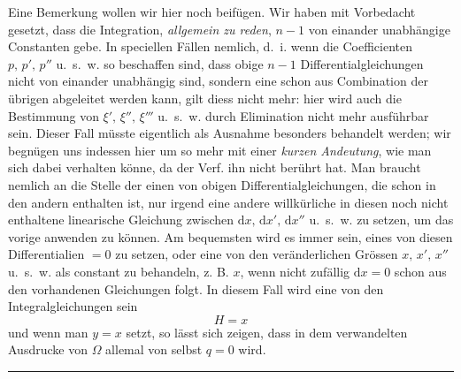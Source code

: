 Eine Bemerkung wollen wir hier noch beifügen. Wir haben mit Vorbedacht gesetzt, dass die Integration, \emph{allgemein zu reden}, \(n-1\) von einander unabhängige Constanten gebe. In speciellen Fällen nemlich, d.\ i. wenn die Coefficienten \(p,\,p',\,p''\) u.\ s.\ w. so beschaffen sind, dass obige \(n-1\) Differentialgleichungen nicht von einander unabhängig sind, sondern eine schon aus Combination der übrigen abgeleitet werden kann, gilt diess nicht mehr: hier wird auch die Bestimmung von \(\xi',\,\xi'',\,\xi'''\) u.\ s.\ w. durch Elimination nicht mehr ausführbar sein. Dieser Fall müsste eigentlich als Ausnahme besonders behandelt werden; wir begnügen uns indessen hier um so mehr mit einer \emph{kurzen Andeutung}, wie man sich dabei verhalten könne, da der Verf. ihn nicht berührt hat. Man braucht nemlich an die Stelle der einen von obigen Differentialgleichungen, die schon in den andern enthalten ist, nur irgend eine andere willkürliche in diesen noch nicht enthaltene linearische Gleichung zwischen \(\mathrm{d}x,\,\mathrm{d}x',\,\mathrm{d}x''\) u.\ s.\ w. zu setzen, um das vorige anwenden zu können. Am bequemsten wird es immer sein, eines von diesen Differentialien \(=0\) zu setzen, oder eine von den veränderlichen Grössen \(x,\,x',\,x''\) u.\ s.\ w.
als constant zu behandeln, z. B. \(x\), wenn nicht zufällig \(\mathrm{d}x=0\) schon aus den
vorhandenen Gleichungen folgt. In diesem Fall wird eine von den Integralgleichungen sein
\[
H=x
\]
und wenn man \(y=x\) setzt, so lässt sich zeigen, dass in dem verwandelten Ausdrucke von \(\Omega\) allemal von selbst \(q=0\) wird.

\begin{center}\rule{0.25\linewidth}{0.3pt}\end{center}


